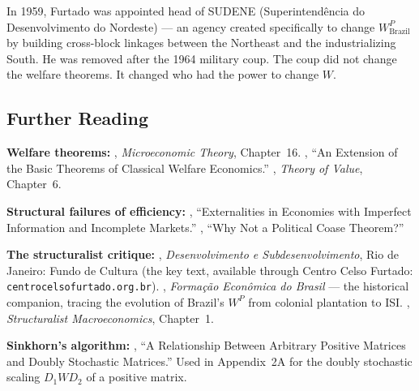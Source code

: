 \documentclass[../structural_economics_book.tex]{subfiles}
\begin{document}
In 1959, Furtado was appointed head of SUDENE (Superintend\^{e}ncia do Desenvolvimento do Nordeste) --- an agency created specifically to change $W^P_{\text{Brazil}}$ by building cross-block linkages between the Northeast and the industrializing South. He was removed after the 1964 military coup. The coup did not change the welfare theorems. It changed who had the power to change $W$.


\subsection*{Further Reading}

\textbf{Welfare theorems:} \citet{mascolell1995microeconomic}, \textit{Microeconomic Theory}, Chapter~16. \citet{arrow1951extension}, ``An Extension of the Basic Theorems of Classical Welfare Economics.'' \citet{debreu1959theory}, \textit{Theory of Value}, Chapter~6.

\textbf{Structural failures of efficiency:} \citet{greenwald1986externalities}, ``Externalities in Economies with Imperfect Information and Incomplete Markets.'' \citet{acemoglu2003why}, ``Why Not a Political Coase Theorem?''

\textbf{The structuralist critique:} \citet{furtado1961desenvolvimento}, \textit{Desenvolvimento e Subdesenvolvimento}, Rio de Janeiro: Fundo de Cultura (the key text, available through Centro Celso Furtado: \texttt{centrocelsofurtado.org.br}). \citet{furtado1959formacao}, \textit{Forma\c{c}\~{a}o Econ\^{o}mica do Brasil} --- the historical companion, tracing the evolution of Brazil's $W^P$ from colonial plantation to ISI. \citet{taylor1983structuralist}, \textit{Structuralist Macroeconomics}, Chapter~1.

\textbf{Sinkhorn's algorithm:} \citet{sinkhorn1964relationship}, ``A Relationship Between Arbitrary Positive Matrices and Doubly Stochastic Matrices.'' Used in Appendix~2A for the doubly stochastic scaling $D_1WD_2$ of a positive matrix.
\end{document}
